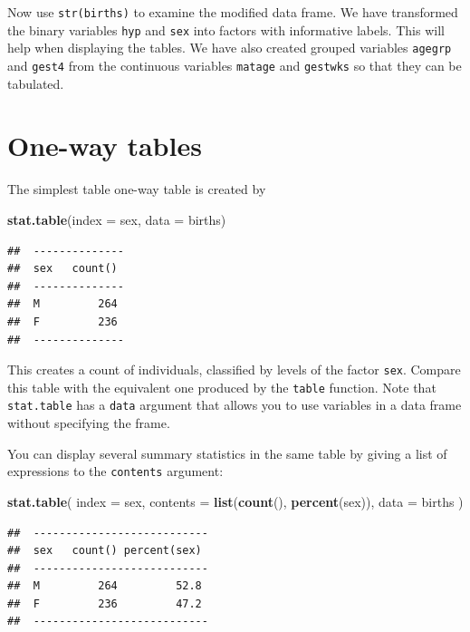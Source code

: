 \documentclass[
]{book}
\newenvironment{Shaded}{\begin{snugshade}}{\end{snugshade}}
\newcommand{\AttributeTok}[1]{\textcolor[rgb]{0.13,0.29,0.53}{#1}}
\newcommand{\FunctionTok}[1]{\textcolor[rgb]{0.13,0.29,0.53}{\textbf{#1}}}
\newcommand{\NormalTok}[1]{#1}
\theoremstyle{definition}
\theoremstyle{definition}
\theoremstyle{definition}
\theoremstyle{definition}
\theoremstyle{remark}
\begin{document}
Now use \texttt{str(births)} to examine the modified data frame. We have
transformed the binary variables \texttt{hyp} and \texttt{sex} into factors
with informative labels. This will help when displaying the tables. We
have also created grouped variables \texttt{agegrp} and \texttt{gest4} from
the continuous variables \texttt{matage} and \texttt{gestwks} so that they
can be tabulated.

\section{One-way tables}\label{one-way-tables}

The simplest table one-way table is created by

\begin{Shaded}
\begin{Highlighting}[]
\FunctionTok{stat.table}\NormalTok{(}\AttributeTok{index =}\NormalTok{ sex, }\AttributeTok{data =}\NormalTok{ births)}
\end{Highlighting}
\end{Shaded}

\begin{verbatim}
##  -------------- 
##  sex   count()  
##  -------------- 
##  M         264  
##  F         236  
##  --------------
\end{verbatim}

This creates a count of individuals, classified by levels of the
factor \texttt{sex}. Compare this table with the equivalent one produced
by the \texttt{table} function. Note that \texttt{stat.table} has a
\texttt{data} argument that allows you to use variables in a data frame without
specifying the frame.

You can display several summary statistics in the same table by
giving a list of expressions to the \texttt{contents} argument:

\begin{Shaded}
\begin{Highlighting}[]
\FunctionTok{stat.table}\NormalTok{(}
  \AttributeTok{index =}\NormalTok{ sex, }
  \AttributeTok{contents =} \FunctionTok{list}\NormalTok{(}\FunctionTok{count}\NormalTok{(), }\FunctionTok{percent}\NormalTok{(sex)), }
  \AttributeTok{data =}\NormalTok{ births}
\NormalTok{)}
\end{Highlighting}
\end{Shaded}

\begin{verbatim}
##  --------------------------- 
##  sex   count() percent(sex)  
##  --------------------------- 
##  M         264         52.8  
##  F         236         47.2  
##  ---------------------------
\end{verbatim}
\end{document}
